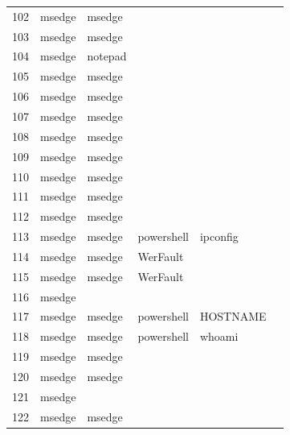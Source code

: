 \documentclass[a4paper,twoside,12pt]{book}
\begin{document}
\begin{appendices}
\begin{table}
\begin{tabular}{llllll}
		102 &  msedge &         msedge &                &                &                \\
		103 &  msedge &         msedge &                &                &                \\
		104 &  msedge &        notepad &                &                &                \\
		105 &  msedge &         msedge &                &                &                \\
		106 &  msedge &         msedge &                &                &                \\
		107 &  msedge &         msedge &                &                &                \\
		108 &  msedge &         msedge &                &                &                \\
		109 &  msedge &         msedge &                &                &                \\
		110 &  msedge &         msedge &                &                &                \\
		111 &  msedge &         msedge &                &                &                \\
		112 &  msedge &         msedge &                &                &                \\
		113 &  msedge &         msedge &     powershell &       ipconfig &                \\
		114 &  msedge &         msedge &       WerFault &                &                \\
		115 &  msedge &         msedge &       WerFault &                &                \\
		116 &  msedge &                &                &                &                \\
		117 &  msedge &         msedge &     powershell &       HOSTNAME &                \\
		118 &  msedge &         msedge &     powershell &         whoami &                \\
		119 &  msedge &         msedge &                &                &                \\
		120 &  msedge &         msedge &                &                &                \\
		121 &  msedge &                &                &                &                \\
		122 &  msedge &         msedge &                &                &                \\

\end{tabular}
\end{table}
\end{appendices}
\end{document}
